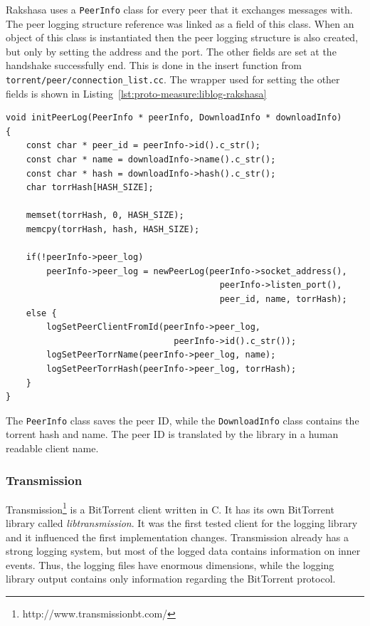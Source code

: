 Rakshasa uses a \texttt{PeerInfo} class for every peer that it exchanges
messages with.  The peer logging structure reference was linked as a field of
this class. When an object of this class is instantiated then the peer logging
structure is also created, but only by setting the address and the port. The
other fields are set at the handshake successfully end. This is done in the
insert function from \texttt{torrent/peer/connection\_list.cc}. The wrapper
used for setting the other fields is shown in
Listing~\ref{lst:proto-measure:liblog-rakshasa}

\lstset{language=C,caption=Library Logging in
libtorrent-rakshasa,label=lst:proto-measure:liblog-rakshasa}
\begin{lstlisting}
void initPeerLog(PeerInfo * peerInfo, DownloadInfo * downloadInfo)
{
    const char * peer_id = peerInfo->id().c_str();
    const char * name = downloadInfo->name().c_str();
    const char * hash = downloadInfo->hash().c_str();
    char torrHash[HASH_SIZE];

    memset(torrHash, 0, HASH_SIZE);
    memcpy(torrHash, hash, HASH_SIZE);

    if(!peerInfo->peer_log)
        peerInfo->peer_log = newPeerLog(peerInfo->socket_address(),
                                          peerInfo->listen_port(),
                                          peer_id, name, torrHash);
    else {
        logSetPeerClientFromId(peerInfo->peer_log,
                                 peerInfo->id().c_str());
        logSetPeerTorrName(peerInfo->peer_log, name);
        logSetPeerTorrHash(peerInfo->peer_log, torrHash);
    }
}
\end{lstlisting}

The \texttt{PeerInfo} class saves the peer ID, while the \texttt{DownloadInfo}
class contains the torrent hash and name. The peer ID is translated by the
library in a human readable client name.

\subsubsection{Transmission}

Transmission\footnote{http://www.transmissionbt.com/} is a BitTorrent client
written in C. It has its own BitTorrent library called
\textit{libtransmission}. It was the first tested client for the logging
library and it influenced the first implementation changes. Transmission
already has a strong logging system, but most of the logged data contains
information on inner events. Thus, the logging files have enormous dimensions,
while the logging library output contains only information regarding the
BitTorrent protocol.

